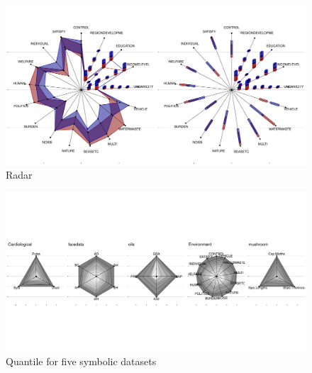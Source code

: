 \documentclass[article]{jss}
\begin{document}
\begin{figure}[htbp]
\centering
\includegraphics[width=1\textwidth]{ggESDA_Jiang&Wu_20210915-radar.pdf} 
\caption{\label{fig:radar} Radar}
\end{figure}


\begin{figure}[htbp]
\centering
\includegraphics[width=1\textwidth]{quantile_5data.pdf} 
\caption{\label{fig:quantile5} Quantile for five symbolic datasets}
\end{figure}



\end{document}
